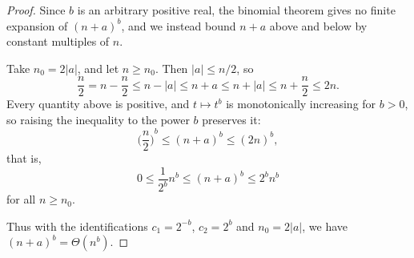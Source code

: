 \begin{proof}
  Since $b$ is an arbitrary positive real, the binomial theorem gives no finite
  expansion of ${(n + a)}^b$, and we instead bound $n + a$ above and below by
  constant multiples of $n$.

  Take $n_0 = 2\lvert a \rvert$, and let $n \geq n_0$. Then $\lvert a \rvert
  \leq n/2$, so
  \[
    \frac{n}{2} = n - \frac{n}{2} \leq n - \lvert a \rvert \leq n + a
    \leq n + \lvert a \rvert \leq n + \frac{n}{2} \leq 2n.
  \]
  Every quantity above is positive, and $t \mapsto t^b$ is monotonically
  increasing for $b > 0$, so raising the inequality to the power $b$ preserves
  it:
  \[
    {\biggl(\frac{n}{2}\biggr)}^b \leq {(n + a)}^b \leq {(2n)}^b,
  \]
  that is,
  \[
    0 \leq \frac{1}{2^b} n^b \leq {(n + a)}^b \leq 2^b n^b
  \]
  for all $n \geq n_0$.

  Thus with the identifications $c_1 = 2^{-b}$, $c_2 = 2^b$ and
  $n_0 = 2\lvert a \rvert$, we have ${(n + a)}^b = \Theta(n^b)$.
\end{proof}
